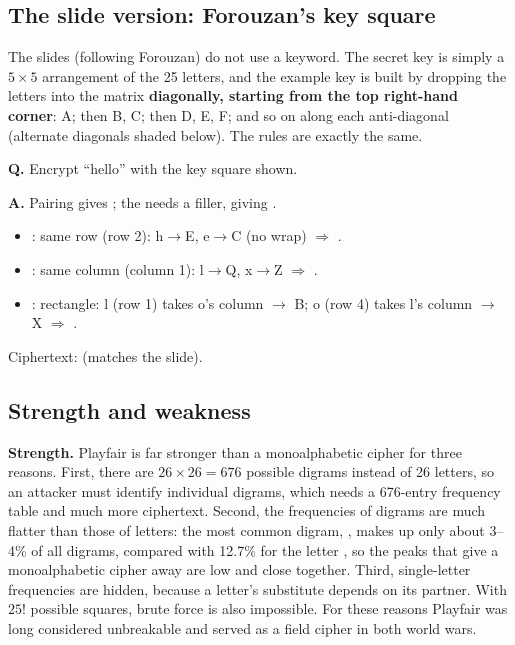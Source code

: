 \subsection{The slide version: Forouzan's key square}
The slides (following Forouzan) do not use a keyword. The secret key is simply a $5 \times 5$ arrangement of the 25 letters, and the example key is built by dropping the letters into the matrix \textbf{diagonally, starting from the top right-hand corner}: A; then B, C; then D, E, F; and so on along each anti-diagonal (alternate diagonals shaded below). The rules are exactly the same.

\begin{worked}
\begin{minipage}[c]{0.36\textwidth}
\centering
{}
\end{minipage}\hfill
\begin{minipage}[c]{0.6\textwidth}
\textbf{Q.} Encrypt ``hello'' with the key square shown.

\textbf{A.} Pairing gives ; the  needs a filler, giving .
\begin{itemize}
  \item {}: same row (row 2): h$\to$E, e$\to$C (no wrap) $\Rightarrow$ .
  \item {}: same column (column 1): l$\to$Q, x$\to$Z $\Rightarrow$ .
  \item {}: rectangle: l (row 1) takes o's column $\to$ B; o (row 4) takes l's column $\to$ X $\Rightarrow$ .
\end{itemize}
Ciphertext: \textbf{} (matches the slide).
\end{minipage}
\end{worked}

\subsection{Strength and weakness}
\textbf{Strength.} Playfair is far stronger than a monoalphabetic cipher for three reasons. First, there are $26 \times 26 = 676$ possible digrams instead of 26 letters, so an attacker must identify individual digrams, which needs a 676-entry frequency table and much more ciphertext. Second, the frequencies of digrams are much flatter than those of letters: the most common digram, , makes up only about 3--4\% of all digrams, compared with 12.7\% for the letter , so the peaks that give a monoalphabetic cipher away are low and close together. Third, single-letter frequencies are hidden, because a letter's substitute depends on its partner. With $25!$ possible squares, brute force is also impossible. For these reasons Playfair was long considered unbreakable and served as a field cipher in both world wars.

